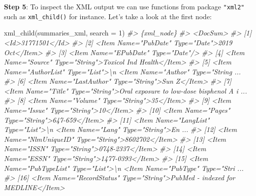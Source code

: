 \documentclass[
]{book}
\newenvironment{Shaded}{\begin{snugshade}}{\end{snugshade}}
\newcommand{\AttributeTok}[1]{\textcolor[rgb]{0.77,0.63,0.00}{#1}}
\newcommand{\CommentTok}[1]{\textcolor[rgb]{0.56,0.35,0.01}{\textit{#1}}}
\newcommand{\DecValTok}[1]{\textcolor[rgb]{0.00,0.00,0.81}{#1}}
\newcommand{\FunctionTok}[1]{\textcolor[rgb]{0.00,0.00,0.00}{#1}}
\newcommand{\NormalTok}[1]{#1}
\begin{document}
\textbf{Step 5}: To inspect the XML output we can use functions from package \texttt{"xml2"}
such as \texttt{xml\_child()} for instance. Let's take a look at the first node:

\begin{Shaded}
\begin{Highlighting}[]
\FunctionTok{xml\_child}\NormalTok{(summaries\_xml, }\AttributeTok{search =} \DecValTok{1}\NormalTok{)}
\CommentTok{\#\textgreater{} \{xml\_node\}}
\CommentTok{\#\textgreater{} \textless{}DocSum\textgreater{}}
\CommentTok{\#\textgreater{}  [1] \textless{}Id\textgreater{}31771501\textless{}/Id\textgreater{}}
\CommentTok{\#\textgreater{}  [2] \textless{}Item Name="PubDate" Type="Date"\textgreater{}2019 Oct\textless{}/Item\textgreater{}}
\CommentTok{\#\textgreater{}  [3] \textless{}Item Name="EPubDate" Type="Date"/\textgreater{}}
\CommentTok{\#\textgreater{}  [4] \textless{}Item Name="Source" Type="String"\textgreater{}Toxicol Ind Health\textless{}/Item\textgreater{}}
\CommentTok{\#\textgreater{}  [5] \textless{}Item Name="AuthorList" Type="List"\textgreater{}\textbackslash{}n  \textless{}Item Name="Author" Type="String ...}
\CommentTok{\#\textgreater{}  [6] \textless{}Item Name="LastAuthor" Type="String"\textgreater{}Sun Z\textless{}/Item\textgreater{}}
\CommentTok{\#\textgreater{}  [7] \textless{}Item Name="Title" Type="String"\textgreater{}Oral exposure to low{-}dose bisphenol A i ...}
\CommentTok{\#\textgreater{}  [8] \textless{}Item Name="Volume" Type="String"\textgreater{}35\textless{}/Item\textgreater{}}
\CommentTok{\#\textgreater{}  [9] \textless{}Item Name="Issue" Type="String"\textgreater{}10\textless{}/Item\textgreater{}}
\CommentTok{\#\textgreater{} [10] \textless{}Item Name="Pages" Type="String"\textgreater{}647{-}659\textless{}/Item\textgreater{}}
\CommentTok{\#\textgreater{} [11] \textless{}Item Name="LangList" Type="List"\textgreater{}\textbackslash{}n  \textless{}Item Name="Lang" Type="String"\textgreater{}En ...}
\CommentTok{\#\textgreater{} [12] \textless{}Item Name="NlmUniqueID" Type="String"\textgreater{}8602702\textless{}/Item\textgreater{}}
\CommentTok{\#\textgreater{} [13] \textless{}Item Name="ISSN" Type="String"\textgreater{}0748{-}2337\textless{}/Item\textgreater{}}
\CommentTok{\#\textgreater{} [14] \textless{}Item Name="ESSN" Type="String"\textgreater{}1477{-}0393\textless{}/Item\textgreater{}}
\CommentTok{\#\textgreater{} [15] \textless{}Item Name="PubTypeList" Type="List"\textgreater{}\textbackslash{}n  \textless{}Item Name="PubType" Type="Stri ...}
\CommentTok{\#\textgreater{} [16] \textless{}Item Name="RecordStatus" Type="String"\textgreater{}PubMed {-} indexed for MEDLINE\textless{}/Item\textgreater{}}

\end{Highlighting}
\end{Shaded}
\end{document}
